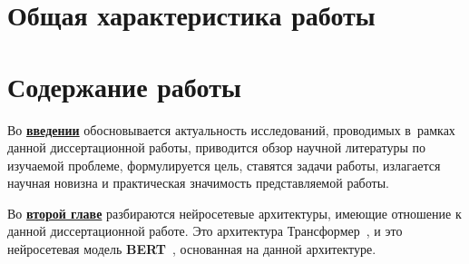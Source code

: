 \section*{Общая характеристика работы}

\newcommand{\actuality}{\underline{\textbf{\actualityTXT}}}
\newcommand{\progress}{\underline{\textbf{\progressTXT}}}
\newcommand{\aim}{\underline{{\textbf\aimTXT}}}
\newcommand{\tasks}{\underline{\textbf{\tasksTXT}}}
\newcommand{\novelty}{\underline{\textbf{\noveltyTXT}}}
\newcommand{\appropriation}{\underline{\textbf{\appropriationTXT}}}
\newcommand{\influence}{\underline{\textbf{\influenceTXT}}}
\newcommand{\methods}{\underline{\textbf{\methodsTXT}}}
\newcommand{\defpositions}{\underline{\textbf{\defpositionsTXT}}}
\newcommand{\reliability}{\underline{\textbf{\reliabilityTXT}}}
\newcommand{\probation}{\underline{\textbf{\probationTXT}}}
\newcommand{\contribution}{\underline{\textbf{\contributionTXT}}}
\newcommand{\publications}{\underline{\textbf{\publicationsTXT}}}




\section*{Содержание работы}
Во \underline{\textbf{введении}} обосновывается актуальность
исследований, проводимых в~рамках данной диссертационной работы,
приводится обзор научной литературы по изучаемой проблеме,
формулируется цель, ставятся задачи работы, излагается научная новизна
и практическая значимость представляемой работы. 

Во \underline{\textbf{второй главе}} разбираются нейросетевые архитектуры, имеющие отношение к данной диссертационной работе. Это архитектура Трансформер~\cite{vaswani_2017}, и это нейросетевая модель \textbf{BERT}~\cite{devlin_2018}, основанная на данной архитектуре.

